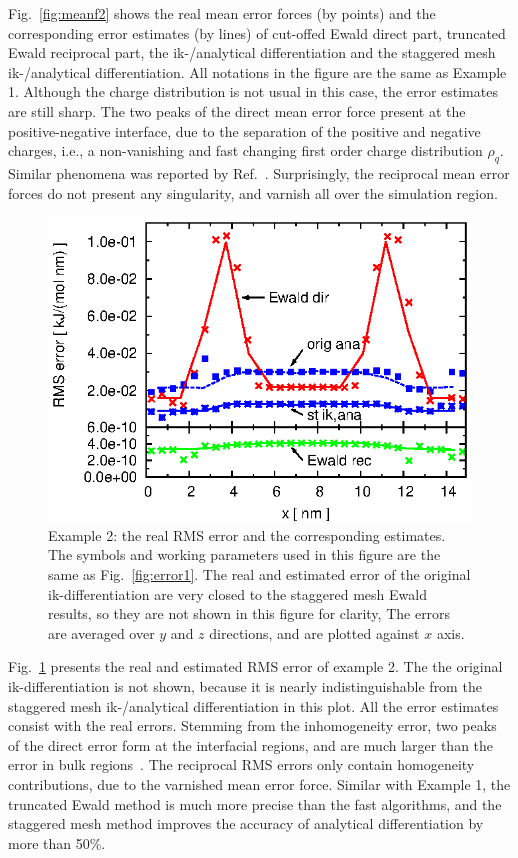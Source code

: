 \documentclass[aps,pre,preprint,unsortedaddress]{revtex4}
\begin{document}
Fig.~\ref{fig:meanf2} shows the real mean error forces (by points) and the
corresponding error estimates (by lines) of cut-offed Ewald direct
part, truncated Ewald reciprocal part, the ik-/analytical
differentiation 
and the staggered mesh ik-/analytical differentiation. All
notations in the figure are the same as Example 1.  Although the
charge distribution is not usual in this case, the error estimates are still
sharp. The two peaks of the direct mean  error force present at the
positive-negative interface, due to the separation of the positive
and negative charges, i.e., a non-vanishing and fast changing first order charge
distribution $\rho_q$.  Similar phenomena was reported by
Ref.~\cite{wang2012}. Surprisingly, 
the reciprocal mean error forces
do not present any singularity, and varnish
all over the simulation region.

\begin{figure}
  \centering
  \includegraphics[]{fig.new/fig.rand2.error.eps}
  \caption{
    Example 2: the real RMS error and the corresponding
    estimates.
    The symbols and working parameters used in this figure are the same as
    Fig.~\ref{fig:error1}.
    The real and estimated error of the original ik-differentiation
    are very closed to the staggered mesh Ewald results, so
    they are not shown in this figure for clarity, 
    The errors are averaged over $y$ and $z$ directions, and are
    plotted against $x$ axis.
  }
  \label{fig:error2}
\end{figure}

Fig.~\ref{fig:error2} presents the real and estimated
RMS error of example 2. The
the original ik-differentiation is not
shown, because it is nearly indistinguishable from the staggered
mesh ik-/analytical differentiation in this plot.
All the error estimates consist with the real errors.
Stemming from the inhomogeneity error,
two peaks of the direct error form at the interfacial
regions, and are much larger than the error in bulk
regions~\cite{wang2012}.
The reciprocal RMS errors only contain homogeneity contributions,
due to the varnished mean error force.
Similar with Example 1, the truncated Ewald
method is much more precise than the fast algorithms, and the
staggered mesh method improves the accuracy of analytical
differentiation by more than 50\%.
\end{document}
